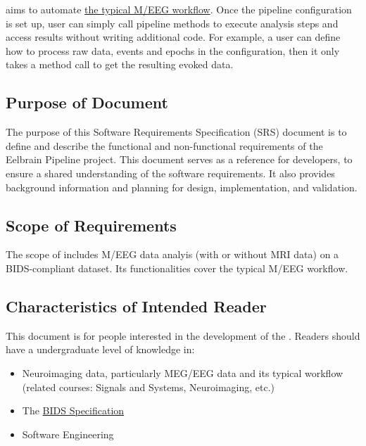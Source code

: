 \documentclass[12pt]{article}
\begin{document}
\progname{} \citep{brodbeck_et_al_2023} aims to automate \href{https://mne.tools/stable/documentation/cookbook.html}{the typical M/EEG workflow}. Once the pipeline configuration is set up, user can simply call pipeline methods to execute analysis steps and access results without writing additional code. For example, a user can define how to process raw data, events and epochs in the configuration, then it only takes a method call to get the resulting evoked data.




\subsection{Purpose of Document}


The purpose of this Software Requirements Specification (SRS) document is to define and describe the functional and non-functional requirements of the Eelbrain Pipeline project. This document serves as a reference for developers, to ensure a shared understanding of the software requirements. It also provides background information and planning for design, implementation, and validation.




\subsection{Scope of Requirements} 


The scope of \progname{} includes M/EEG data analyis (with or without MRI data) on a BIDS-compliant dataset. Its functionalities cover the typical M/EEG workflow. 




\subsection{Characteristics of Intended Reader} \label{sec_IntendedReader}


This document is for people interested in the development of the \progname{}. Readers should have a undergraduate level of knowledge in:


\begin{itemize}
    \item Neuroimaging data, particularly MEG/EEG data and its typical workflow (related courses: Signals and Systems, Neuroimaging, etc.)
    \item The \href{https://bids-specification.readthedocs.io/en/stable/}{BIDS Specification}
    \item Software Engineering
\end{itemize}
\end{document}
